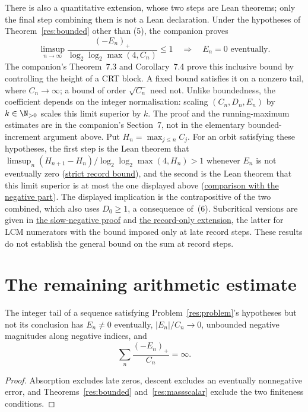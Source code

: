 \documentclass[11pt]{article}
\newcommand{\latecommit}{7380b7871687b6bcc41ca0143c61f232e8af6500}
\newcommand{\laterepobase}{https://github.com/wcook04/plectis-erdos/blob/\latecommit}
\begin{document}
There is also a quantitative extension, whose two steps are Lean
theorems; only the final step combining them is not a Lean declaration.
Under the hypotheses of
Theorem~\ref{res:bounded} other than (5), the companion proves
\[
 \limsup_{n\to\infty}
 \frac{(-E_n)_+}{\log_2\log_2\max(4,C_n)}\le1
 \quad\Longrightarrow\quad E_n=0\text{ eventually}.
\]
The companion's Theorem~7.3 and Corollary~7.4 prove this inclusive
bound by controlling the height of a CRT block. A fixed bound satisfies
it on a nonzero tail, where $C_n\to\infty$; a bound of order
$\sqrt{C_n}$ need not. Unlike boundedness, the coefficient depends on
the integer normalisation: scaling $(C_n,D_n,E_n)$ by $k\in\N_{>0}$
scales this limit superior by $k$. The proof and the running-maximum
estimates are in the companion's Section~7, not in the elementary
bounded-increment argument above. Put $H_n=\max_{j\le n}C_j$. For an
orbit satisfying these hypotheses, the first step is the Lean theorem that
$\limsup_n(H_{n+1}-H_n)/\log_2\log_2\max(4,H_n)>1$ whenever $E_n$ is not
eventually zero
(\href{\laterepobase/lean/ErdosProblems/Erdos243/PaperCompleteR21/ExactOrbitRecordDichotomy.lean\#L363}{strict record bound}),
and the second is the Lean theorem that this limit superior is at most the
one displayed above
(\href{\laterepobase/lean/ErdosProblems/Erdos243/PaperCompleteR11/InclusiveLimsup.lean\#L100}{comparison with the negative part}).
The displayed implication is the contrapositive of the two combined, which
also uses $D_0\ge1$, a consequence of~(6). Subcritical versions are given in
\href{https://github.com/wcook04/plectis-erdos/blob/eccd8afc6db3c02a2265d0601b727d6c5e4467d5/lean/ErdosProblems/Erdos243/SlowNegativePartRigidity.md}{the slow-negative proof}
and \href{https://github.com/wcook04/plectis-erdos/blob/eccd8afc6db3c02a2265d0601b727d6c5e4467d5/lean/ErdosProblems/Erdos243/LcmRecordExcess.md\#5-record-only-subcritical-log-log-bound}
{the record-only extension}, the latter for LCM numerators with the bound
imposed only at late record steps.
These results do not establish the general bound on the sum at record steps.

\section{The remaining arithmetic estimate}\label{sec:open}
\begin{proposition}\label{res:frontier}
The integer tail of a sequence satisfying Problem~\ref{res:problem}'s
hypotheses but not its conclusion has $E_n\ne0$ eventually,
$|E_n|/C_n\to0$, unbounded negative magnitudes along negative indices,
and
\[
 \sum_n\frac{(-E_n)_+}{C_n}=\infty.
\]
\end{proposition}
\begin{proof}
Absorption excludes late zeros, descent excludes an eventually
nonnegative error, and Theorems~\ref{res:bounded} and~\ref{res:massscalar}
exclude the two finiteness conditions.
\end{proof}
\end{document}

